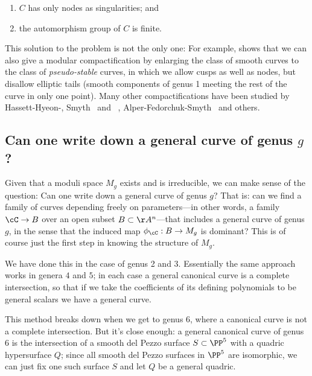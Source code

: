 \begin{enumerate}
\item $C$ has only nodes as singularities; and
\item the automorphism group of $C$ is finite.
\end{enumerate}

This  solution to the problem is not the only one: For example, \cite{MR1106299} shows that we can also give a modular compactification by enlarging the class of smooth curves to the class of \emph{pseudo-stable} curves, in which we allow cusps as well as nodes, but disallow elliptic tails (smooth components of genus 1 meeting the rest of the curve in only one point). Many other compactifications have been studied by Hassett-Hyeon-\cite{MR2500894}, Smyth~\cite{MR2801404} and ~\cite{MR3044128}, Alper-Fedorchuk-Smyth~\cite{MR3020172} and others.

\subsection{Can one write down a general curve of genus $g$?}


Given that a moduli space $M_g$ exists and is irreducible, we can make sense of the question: Can one write down a general curve of genus $g$?
That is: can we find a family of curves depending freely on parameters---in other words, a family $\cC \to B$ over an open subset $B \subset \AA^n$---that includes a general curve of genus $g$, in the sense that the induced map $\phi_\cC : B \to M_g$ is dominant? This is of course just the first step in knowing the structure of $M_g$.

We have done this in the case of genus 2 and 3. Essentially
the same approach works in genera $4$ and $5$; in each case a general canonical curve is a complete intersection, so that if we take the coefficients of its defining polynomials to be general scalars we have a general curve.

This method breaks down when we get to genus 6, where a canonical curve is not a complete intersection. But it's close enough: a general canonical curve of genus 6 is the intersection of a smooth del Pezzo surface $S \subset \PP^5$ with a quadric hypersurface $Q$; since all smooth del Pezzo surfaces in $\PP^5$ are isomorphic, we can just fix one such surface $S$ and let $Q$ be a general quadric.

